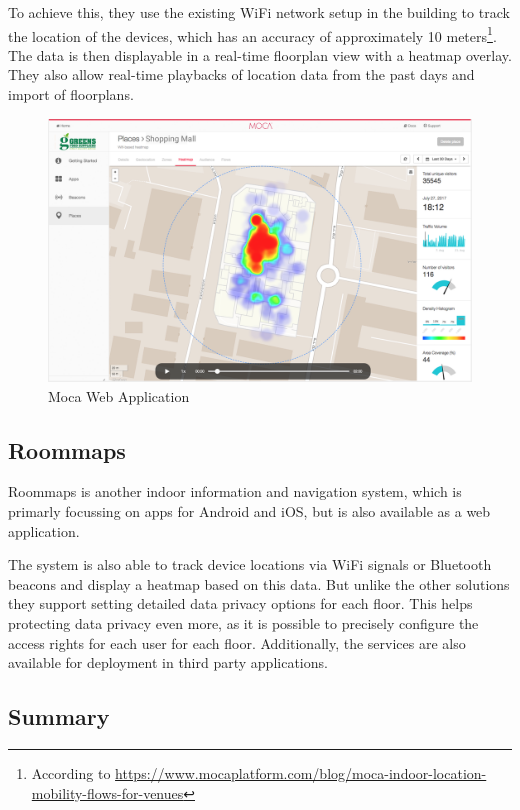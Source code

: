 To achieve this, they use the existing WiFi network setup in the building to track the location of the devices, which has an accuracy of approximately 10 meters\footnote{According to \url{https://www.mocaplatform.com/blog/moca-indoor-location-mobility-flows-for-venues}}. The data is then displayable in a real-time floorplan view with a heatmap overlay. They also allow real-time playbacks of location data from the past days and import of floorplans.

\begin{figure}[!hb]
	\centering
	\includegraphics[width=0.9\linewidth]{images/Moca}
	\caption{Moca Web Application}
	\label{fig:InfsoftApplication}
\end{figure}

\clearpage

\subsection{Roommaps}

Roommaps is another indoor information and navigation system, which is primarly focussing on apps for Android and iOS, but is also available as a web application.

The system is also able to track device locations via WiFi signals or Bluetooth beacons and display a heatmap based on this data. 
But unlike the other solutions they support setting detailed data privacy options for each floor. This helps protecting data privacy even more, as it is possible to precisely configure the access rights for each user for each floor. Additionally, the services are also available for deployment in third party applications.

\subsection{Summary}

